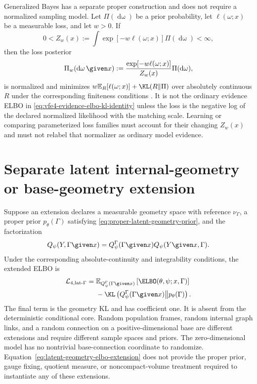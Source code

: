 Generalized Bayes has a separate proper construction and does not require a normalized sampling model. Let $\Pi(\mathop{\mathrm d\omega})$ be a prior probability, let $\ell(\omega;x)$ be a measurable loss, and let $w>0$. If
\begin{equation}
0<Z_w(x):=\int\exp[-w\ell(\omega;x)]\Pi(\mathop{\mathrm d\omega})<\infty,
\label{eq:generalized-bayes-finite-normalizer}
\end{equation}
then the loss posterior
\begin{equation}
\Pi_w(\mathop{\mathrm d\omega}\given x)
:=\frac{\exp[-w\ell(\omega;x)]}{Z_w(x)}
\Pi(\mathop{\mathrm d\omega}),
\label{eq:generalized-bayes-loss-posterior}
\end{equation}
is normalized and minimizes $w\mathbb E_R[\ell(\omega;x)]+\KL(R\Vert\Pi)$ over absolutely continuous $R$ under the corresponding finiteness conditions \citep{BissiriHolmesWalker2016}. It is not the ordinary evidence ELBO in \cref{eq:vfe4-evidence-elbo-kl-identity} unless the loss is the negative log of the declared normalized likelihood with the matching scale. Learning or comparing parameterized loss families must account for their changing $Z_w(x)$ and must not relabel that normalizer as ordinary model evidence.

\section{Separate latent internal-geometry or base-geometry extension}

Suppose an extension declares a measurable geometry space with reference $\nu_\Gamma$, a proper prior $p_\theta(\Gamma)$ satisfying \cref{eq:proper-latent-geometry-prior}, and the factorization
\begin{equation}
Q_\psi(Y,\Gamma\given x)
=Q_\psi^\Gamma(\Gamma\given x)
Q_\psi(Y\given x,\Gamma).
\label{eq:latent-geometry-recognition-factorization}
\end{equation}
Under the corresponding absolute-continuity and integrability conditions, the extended ELBO is
\begin{equation}
\begin{aligned}
\mathcal L_{4,\mathrm{lat}\text{-}\Gamma}
={}&\mathbb E_{Q_\psi^\Gamma(\Gamma\given x)}
\left[
\ELBO(\theta,\psi;x,\Gamma)
\right]\\
&-\KL\left(
Q_\psi^\Gamma(\Gamma\given x)
\middle\Vert
p_\theta(\Gamma)
\right).
\end{aligned}
\label{eq:latent-geometry-elbo-extension}
\end{equation}
The final term is the geometry KL and has coefficient one. It is absent from the deterministic conditional core. Random population frames, random internal graph links, and a random connection on a positive-dimensional base are different extensions and require different sample spaces and priors. The zero-dimensional model has no nontrivial base-connection coordinate to randomize. Equation~\eqref{eq:latent-geometry-elbo-extension} does not provide the proper prior, gauge fixing, quotient measure, or noncompact-volume treatment required to instantiate any of these extensions.

